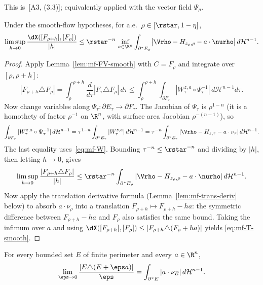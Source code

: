 This is~[A3, (3.3)]; equivalently \cite[Thm.~3.85]{AFP2000} applied with the
vector field $\Psi_\rho$.

\begin{proposition}\label{prop:mf-T-smooth}
Under the smooth-flow hypotheses, for a.e.~$\rho\in[\rstar,1-\eta]$,
\begin{equation}\label{eq:mf-T-smooth}
   \limsup_{h\to 0}\frac{\dX([F_{\rho+h}],[F_\rho])}{|h|}
   \le\rstar^{-n}\,\inf_{a\in\R^n}
      \int_{\partial^*E_\rho}\bigl|\Vrho-H_{z_\rho,\rho}-a\cdot\nurho\bigr|
      \,d\mathcal H^{n-1}.
\end{equation}
\end{proposition}

\begin{proof}
Apply Lemma~\ref{lem:mf-FV-smooth} with $C=F_\rho$ and integrate over
$[\rho,\rho+h]$:
\[
   |F_{\rho+h}\triangle F_\rho|
   =\int_\rho^{\rho+h}\frac{d}{d\tau}|F_\tau\triangle F_\rho|\,d\tau
   \le\int_\rho^{\rho+h}\!\!\int_{\partial F_\tau}
        |W^{z,a}_\tau\circ\Psi_\tau^{-1}|\,d\mathcal H^{n-1}d\tau.
\]
Now change variables along $\Psi_\tau:\partial E_\tau\to\partial F_\tau$.
The Jacobian of $\Psi_\tau$ is $\rho^{1-n}$ (it is a homothety of factor
$\rho^{-1}$ on $\R^n$, with surface area Jacobian $\rho^{-(n-1)}$), so
\begin{equation}\label{eq:mf-jacobian}
   \int_{\partial F_\tau}|W^{z,a}_\tau\circ\Psi_\tau^{-1}|\,d\mathcal H^{n-1}
   =\tau^{1-n}\int_{\partial^*E_\tau}|W^{z,a}_\tau|\,d\mathcal H^{n-1}
   =\tau^{-n}\int_{\partial^*E_\tau}
       |\Vrho-H_{z,\tau}-a\cdot\nu_\tau|\,d\mathcal H^{n-1}.
\end{equation}
The last equality uses~\eqref{eq:mf-W}. Bounding $\tau^{-n}\le\rstar^{-n}$
and dividing by $|h|$, then letting $h\to 0$, gives
\[
   \limsup_{h\to 0}\frac{|F_{\rho+h}\triangle F_\rho|}{|h|}
   \le\rstar^{-n}\int_{\partial^*E_\rho}
      |\Vrho-H_{z_\rho,\rho}-a\cdot\nurho|\,d\mathcal H^{n-1}.
\]
Now apply the translation derivative formula (Lemma~\ref{lem:mf-trans-deriv}
below) to absorb $a\cdot\nu_\rho$ into a translation $F_{\rho+h}\mapsto
F_{\rho+h}-ha$: the symmetric difference between $F_{\rho+h}-ha$ and $F_\rho$
also satisfies the same bound. Taking the infimum over $a$ and using
$\dX([F_{\rho+h}],[F_\rho])\le|F_{\rho+h}\triangle(F_\rho+ha)|$ yields
\eqref{eq:mf-T-smooth}.
\end{proof}

\begin{lemma}\label{lem:mf-trans-deriv}
For every bounded set $E$ of finite perimeter and every $a\in\R^n$,
\begin{equation}\label{eq:mf-trans-deriv}
   \lim_{\eps\to 0}\frac{|E\triangle(E+\eps a)|}{\eps}
   =\int_{\partial^*E}|a\cdot\nu_E|\,d\mathcal H^{n-1}.
\end{equation}
\end{lemma}

